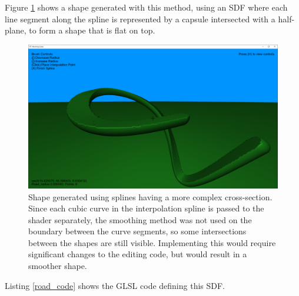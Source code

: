 \documentclass[11pt]{article}
\begin{document}
Figure \ref{fig:bezier_roads} shows a shape generated with this method, using an SDF where each line segment along the spline is represented by a capsule intersected with a half-plane, to form a shape that is flat on top.
\begin{figure}[H]
  \includegraphics[width=\textwidth]{bezier_roads.png}
  \caption{Shape generated using splines having a more complex cross-section. Since each cubic curve in the interpolation spline is passed to the shader separately, the smoothing method was not used on the boundary between the curve segments, so some intersections between the shapes are still visible. Implementing this would require significant changes to the editing code, but would result in a smoother shape.}
  \label{fig:bezier_roads}
\end{figure}

Listing \ref{road_code} shows the GLSL code defining this SDF.
\end{document}
